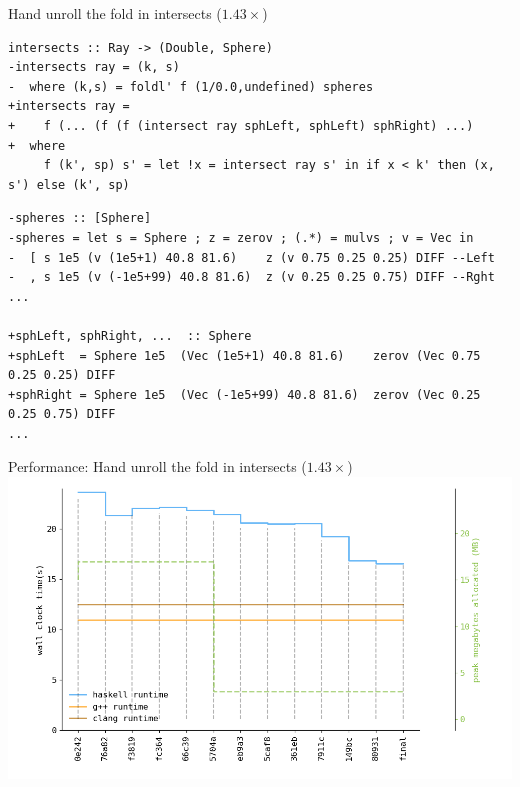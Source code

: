 \documentclass[8pt]{beamer}
\begin{document}
\begin{frame}[fragile]{Hand unroll the fold in intersects ($1.43\times$)}

\begin{verbatim}
intersects :: Ray -> (Double, Sphere)
-intersects ray = (k, s)
-  where (k,s) = foldl' f (1/0.0,undefined) spheres
+intersects ray =
+    f (... (f (f (intersect ray sphLeft, sphLeft) sphRight) ...)
+  where
     f (k', sp) s' = let !x = intersect ray s' in if x < k' then (x, s') else (k', sp)
\end{verbatim}


\begin{verbatim}
-spheres :: [Sphere]
-spheres = let s = Sphere ; z = zerov ; (.*) = mulvs ; v = Vec in
-  [ s 1e5 (v (1e5+1) 40.8 81.6)    z (v 0.75 0.25 0.25) DIFF --Left
-  , s 1e5 (v (-1e5+99) 40.8 81.6)  z (v 0.25 0.25 0.75) DIFF --Rght
...

+sphLeft, sphRight, ...  :: Sphere
+sphLeft  = Sphere 1e5  (Vec (1e5+1) 40.8 81.6)    zerov (Vec 0.75 0.25 0.25) DIFF
+sphRight = Sphere 1e5  (Vec (-1e5+99) 40.8 81.6)  zerov (Vec 0.25 0.25 0.75) DIFF
...
\end{verbatim}

\end{frame}

\begin{frame}[fragile]{Performance: Hand unroll the fold in intersects ($1.43\times$)}
\includegraphics[height=0.6\textwidth]{perfdata-upto-80931-gen.png}
\end{frame}
\end{document}
